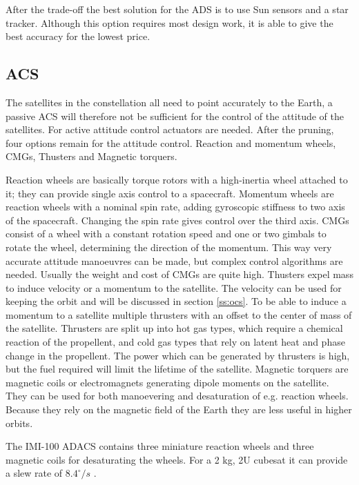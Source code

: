 After the trade-off the best solution for the \ac{ADS} is to use Sun sensors and a star tracker. Although this option requires most design work, it is able to give the best accuracy for the lowest price.  

\subsection{\acl{ACS}}
\label{ss:acs}
The satellites in the constellation all need to point accurately to the Earth, a passive \ac{ACS} will therefore not be sufficient for the control of the attitude of the satellites. For active attitude control actuators are needed. After the pruning, four options remain for the attitude control. Reaction and momentum wheels, \acp{CMG}, Thusters and Magnetic torquers.

Reaction wheels are basically torque rotors with a high-inertia wheel attached to it; they can provide single axis control to a spacecraft. Momentum wheels are reaction wheels with a nominal spin rate, adding gyroscopic stiffness to two axis of the spacecraft. Changing the spin rate gives control over the third axis.
\acp{CMG} consist of a wheel with a constant rotation speed and one or two gimbals to rotate the wheel, determining the direction of the momentum. This way very accurate attitude manoeuvres can be made, but complex control algorithms are needed. Usually the weight and cost of \acp{CMG} are quite high.
Thusters expel mass to induce velocity or a momentum to the satellite. The velocity can be used for keeping the orbit and will be discussed in section \ref{ss:ocs}. To be able to induce a momentum to a satellite multiple thrusters with an offset to the center of mass of the satellite. Thrusters are split up into hot gas types, which require a chemical reaction of the propellent, and cold gas types that rely on latent heat and phase change in the propellent. The power which can be generated by thrusters is high, but the fuel required will limit the lifetime of the satellite.
Magnetic torquers are magnetic coils or electromagnets generating dipole moments on the satellite. They can be used for both manoevering and desaturation of e.g. reaction wheels. Because they rely on the magnetic field of the Earth they are less useful in higher orbits.

The IMI-100 ADACS contains three miniature reaction wheels and three magnetic coils for desaturating the wheels. For a 2 kg, 2U cubesat it can provide a slew rate of $8.4^\circ/s$ \cite{imi100}.

